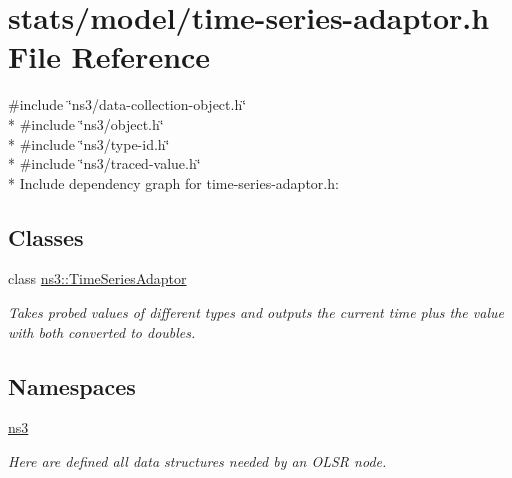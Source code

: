 \hypertarget{time-series-adaptor_8h}{}\section{stats/model/time-\/series-\/adaptor.h File Reference}
\label{time-series-adaptor_8h}
{\ttfamily \#include \char`\"{}ns3/data-\/collection-\/object.\+h\char`\"{}}\\*
{\ttfamily \#include \char`\"{}ns3/object.\+h\char`\"{}}\\*
{\ttfamily \#include \char`\"{}ns3/type-\/id.\+h\char`\"{}}\\*
{\ttfamily \#include \char`\"{}ns3/traced-\/value.\+h\char`\"{}}\\*
Include dependency graph for time-\/series-\/adaptor.h\+:
\subsection*{Classes}
\begin{DoxyCompactItemize}
\item 
class \hyperlink{classns3_1_1TimeSeriesAdaptor}{ns3\+::\+Time\+Series\+Adaptor}
\begin{DoxyCompactList}\small\item\em Takes probed values of different types and outputs the current time plus the value with both converted to doubles. \end{DoxyCompactList}\end{DoxyCompactItemize}
\subsection*{Namespaces}
\begin{DoxyCompactItemize}
\item 
 \hyperlink{namespacens3}{ns3}
\begin{DoxyCompactList}\small\item\em Here are defined all data structures needed by an O\+L\+SR node. \end{DoxyCompactList}\end{DoxyCompactItemize}
